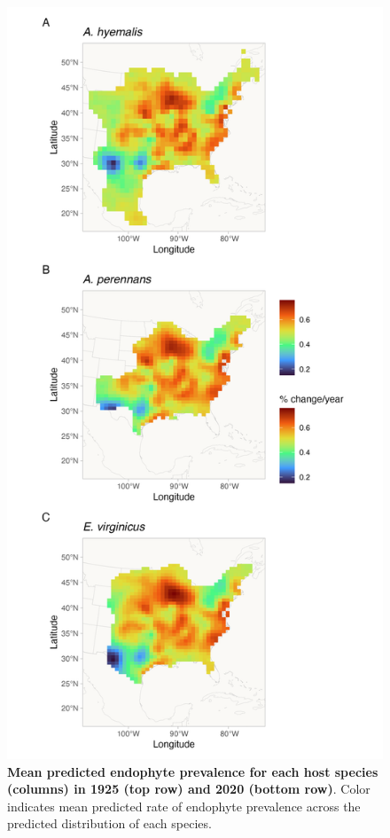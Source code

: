 \documentclass[11pt]{article}
\begin{document}

\begin{figure}[H]
	\label{fig:svc_space_map}
	\centering
	\includegraphics[width = .6\linewidth]{svc_space_map.png}
	\caption{\textbf{Mean predicted endophyte prevalence for each host species (columns) in 1925 (top row) and 2020 (bottom row)}. Color indicates mean predicted rate of endophyte prevalence across the predicted distribution of each species.}
\end{figure}
\end{document}
